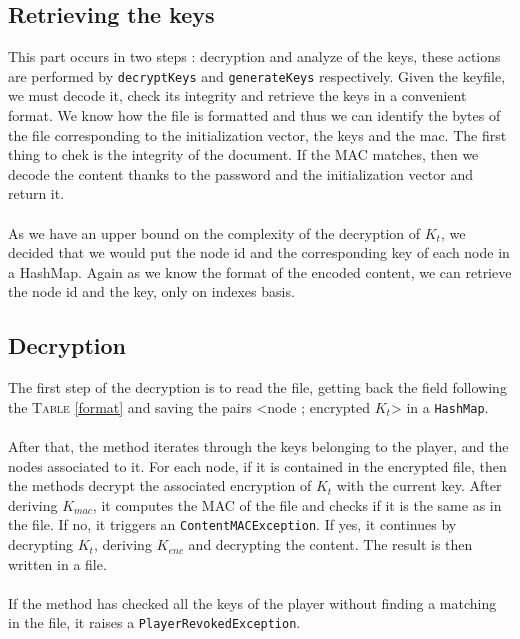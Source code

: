 \documentclass[a4paper,titlepage]{article}
\begin{document}
	\subsection{Retrieving the keys}
This part occurs in two steps : decryption and analyze of the keys, these actions are performed by \texttt{decryptKeys} and \texttt{generateKeys} respectively.
Given the keyfile, we must decode it, check its integrity and retrieve the keys in a convenient format. We know how the file is formatted and thus we can identify the bytes of the file corresponding to the initialization vector, the keys and the mac. The first thing to chek is the integrity of the document. If the MAC matches, then we decode the content thanks to the password and the initialization vector and return it. \\ \\

As we have an upper bound on the complexity of the decryption of $K_t$, we decided that we would put the node id and the corresponding key of each node in a HashMap. Again as we know the format of the encoded content, we can retrieve the node id and the key, only on indexes basis.

	\subsection{Decryption}
The first step of the decryption is to read the file, getting back the field following the \textsc{Table} \ref{format} and saving the pairs <node ; encrypted $K_t$> in a \texttt{HashMap}. 

\paragraph{}

After that, the method iterates through the keys belonging to the player, and the nodes associated to it. For each node, if it is contained in the encrypted file, then the methods decrypt the associated encryption of $K_t$ with the current key. After deriving $K_{mac}$, it computes the MAC of the file and checks if it is the same as in the file. If no, it triggers an \texttt{ContentMACException}. If yes, it continues by decrypting $K_t$, deriving $K_{enc}$ and decrypting the content. The result is then written in a file.

\paragraph{}

If the method has checked all the keys of the player without finding a matching in the file, it raises a \texttt{PlayerRevokedException}.
\end{document}
